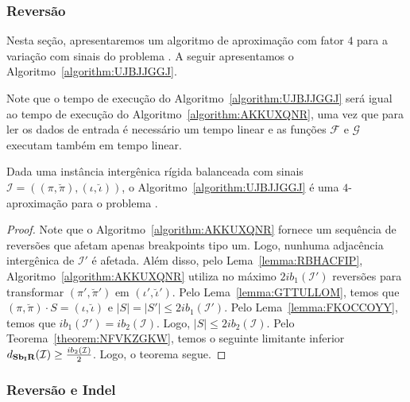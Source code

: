 \subsubsection{Reversão}

Nesta seção, apresentaremos um algoritmo de aproximação com fator $4$ para a variação com sinais do problema \SbIR{}. A seguir apresentamos o Algoritmo~\ref{algorithm:UJBJJGGJ}.



Note que o tempo de execução do Algoritmo~\ref{algorithm:UJBJJGGJ} será igual ao tempo de execução do Algoritmo~\ref{algorithm:AKKUXQNR}, uma vez que para ler os dados de entrada é necessário um tempo linear e as funções $\mathcal{F}$ e $\mathcal{G}$ executam também em tempo linear.

\begin{theorem}\label{theorem:DGTASCUU}
Dada uma instância intergênica rígida balanceada com sinais $\mathcal{I}=((\pi,\breve\pi),(\iota,\breve\iota))$, o Algoritmo~\ref{algorithm:UJBJJGGJ} é uma $4$-aproximação para o problema \SbIR{}.
\end{theorem}
\begin{proof}
Note que o Algoritmo~\ref{algorithm:AKKUXQNR} fornece um sequência de reversões que afetam apenas breakpoints tipo um. Logo, nunhuma adjacência intergênica de $\mathcal{I'}$ é afetada. Além disso, pelo Lema~\ref{lemma:RBHACFIP}, Algoritmo~\ref{algorithm:AKKUXQNR} utiliza no máximo $2ib_1(\mathcal{I'})$ reversões para transformar $(\pi',\breve\pi')$ em $(\iota',\breve\iota')$. Pelo Lema~\ref{lemma:GTTULLOM}, temos que $(\pi,\breve\pi) \cdot S = (\iota,\breve\iota)$ e $|S| = |S'| \le 2ib_1(\mathcal{I'})$. Pelo Lema~\ref{lemma:FKOCCOYY}, temos que $ib_1(\mathcal{I'}) = ib_2(\mathcal{I})$. Logo, $|S| \le 2ib_2(\mathcal{I})$. Pelo Teorema~\ref{theorem:NFVKZGKW}, temos o seguinte limitante inferior $d_{\textbf{Sb\textsubscript{I}R}}(\mathcal{I}) \ge \frac{ib_2(\mathcal{I})}{2}$. Logo, o teorema segue.
\end{proof}

\subsubsection{Reversão e Indel}

